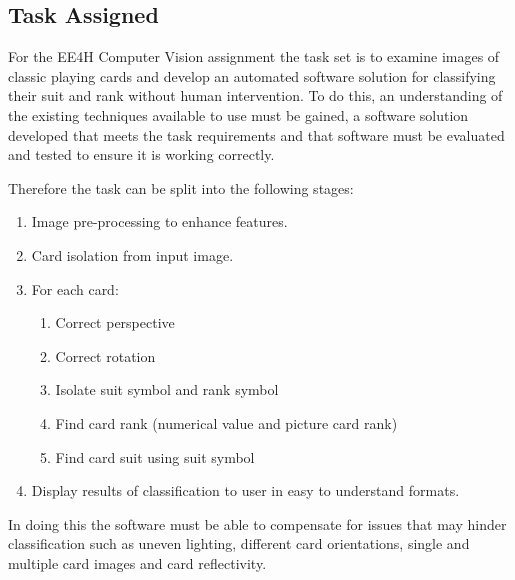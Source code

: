 	\subsection{Task Assigned}
		\label{sec:task}
		For the EE4H Computer Vision assignment the task set is to examine images of classic playing cards and develop an automated software solution for classifying their suit and rank without human intervention. To do this, an understanding of the existing techniques available to use must be gained, a software solution developed that meets the task requirements and that software must be evaluated and tested to ensure it is working correctly. 

		Therefore the task can be split into the following stages:

		\begin{enumerate}
			\item Image pre-processing to enhance features.
			\item Card isolation from input image.
			\item For each card:
			\begin{enumerate}
				\item Correct perspective
				\item Correct rotation
				\item Isolate suit symbol and rank symbol
				\item Find card rank (numerical value and picture card rank)
				\item Find card suit using suit symbol
			\end{enumerate}
			\item Display results of classification to user in easy to understand formats.
		\end{enumerate}

		In doing this the software must be able to compensate for issues that may hinder classification such as uneven lighting, different card orientations, single and multiple card images and card reflectivity.
